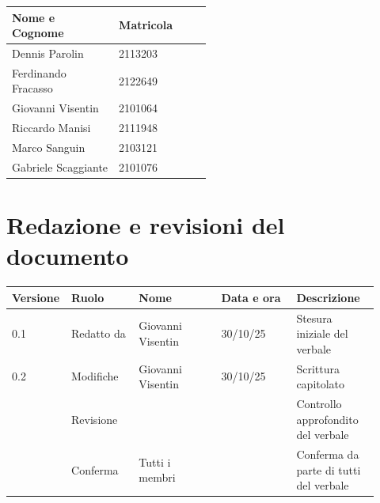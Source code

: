 \documentclass[a4paper,12pt]{article}
\begin{document}
\begin{center}
\small
\renewcommand{\arraystretch}{1.2}
\begin{tabular}{|p{0.3\linewidth}|p{0.2\linewidth}|}
\hline
\rowcolor{gray!60}
\textbf{Nome e Cognome} & \textbf{Matricola} \\
\hline
Dennis Parolin & 2113203 \\
\hline
Ferdinando Fracasso & 2122649 \\
\hline
Giovanni Visentin & 2101064 \\
\hline
Riccardo Manisi & 2111948 \\
\hline
Marco Sanguin & 2103121 \\
\hline
Gabriele Scaggiante & 2101076 \\
\hline
\end{tabular}
\end{center}

\clearpage
\section{Redazione e revisioni del documento}

\begin{center}
\small
\renewcommand{\arraystretch}{1.2} 
\begin{tabular}{|p{0.1\linewidth}|p{0.18\linewidth}|p{0.22\linewidth}|p{0.20\linewidth}|p{0.22\linewidth}|}
\hline
\rowcolor{gray!60} 
\textbf{Versione} & \textbf{Ruolo} & \textbf{Nome} & \textbf{Data e ora} & \textbf{Descrizione} \\
\hline
\rowcolor{white}
0.1 & Redatto da & Giovanni Visentin & 30/10/25 & Stesura iniziale del verbale \\
\hline
\rowcolor{gray!20}
0.2 & Modifiche & Giovanni Visentin & 30/10/25 &  Scrittura capitolato\\
\hline
\rowcolor{white}
 & Revisione &  &  & Controllo approfondito del verbale \\
\hline
\rowcolor{gray!20}
 & Conferma & Tutti i membri &  & Conferma da parte di tutti del verbale \\
\hline

\end{tabular}
\end{center}
\end{document}
